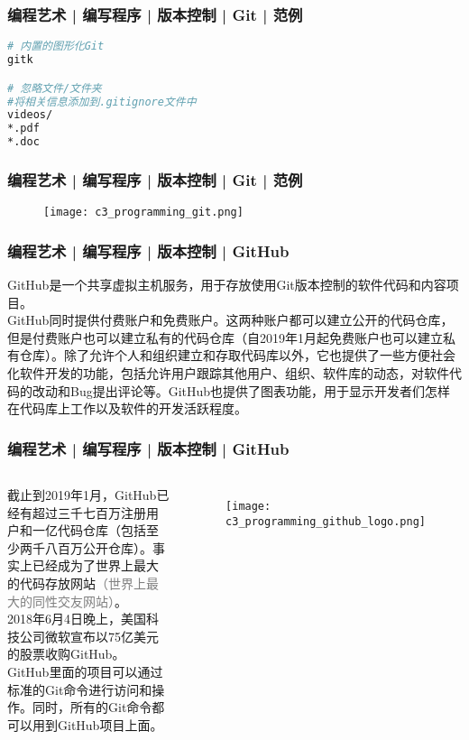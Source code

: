 \begin{frame}[fragile]
  \frametitle{编程艺术 | 编写程序 | 版本控制 | Git | 范例}
\begin{lstlisting}[language=sh]
# 内置的图形化Git
gitk

# 忽略文件/文件夹
#将相关信息添加到.gitignore文件中
videos/
*.pdf
*.doc
\end{lstlisting}
\end{frame}

\begin{frame}
  \frametitle{编程艺术 | 编写程序 | 版本控制 | Git | \alert{范例}}
  \begin{figure}
    \centering
    \texttt{[image: c3\_programming\_git.png]}
  \end{figure}
\end{frame}

\begin{frame}
  \frametitle{编程艺术 | 编写程序 | 版本控制 | \alert{GitHub}}
  GitHub是一个共享虚拟主机服务，用于\alert{存放使用Git版本控制的软件代码和内容项目}。\\
  \vspace{1em}
GitHub同时提供付费账户和免费账户。这两种账户都可以建立公开的代码仓库，但是付费账户也可以建立私有的代码仓库（自2019年1月起免费账户也可以建立私有仓库）。除了允许个人和组织建立和存取代码库以外，它也提供了一些方便社会化软件开发的功能，包括允许用户跟踪其他用户、组织、软件库的动态，对软件代码的改动和Bug提出评论等。GitHub也提供了图表功能，用于显示开发者们怎样在代码库上工作以及软件的开发活跃程度。\\
\end{frame}

\begin{frame}
  \frametitle{编程艺术 | 编写程序 | 版本控制 | \alert{GitHub}}
  \begin{columns}
    截止到2019年1月，GitHub已经有超过三千七百万注册用户和一亿代码仓库（包括至少两千八百万公开仓库）。事实上已经成为了\alert{世界上最大的代码存放网站}\textcolor{gray}{（世界上最大的同性交友网站）}。\\
  \vspace{1em}
  2018年6月4日晚上，美国科技公司微软宣布以75亿美元的股票收购GitHub。\\
  \vspace{1em}
  GitHub里面的项目可以通过标准的Git命令进行访问和操作。同时，所有的Git命令都可以用到GitHub项目上面。
    \begin{figure}
      \centering
      \texttt{[image: c3\_programming\_github\_logo.png]}
    \end{figure}
\end{columns}
\end{frame}

